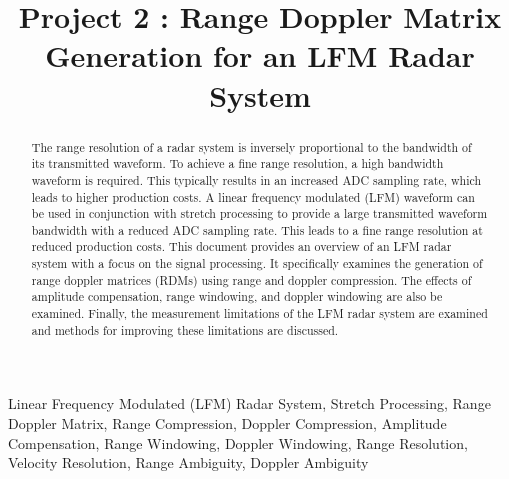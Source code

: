 \documentclass[conference]{IEEEtran}
\begin{document}
\title{Project 2 : Range Doppler Matrix Generation for an LFM Radar System}

\author{
}
\maketitle

\begin{abstract}
The range resolution of a radar system is inversely proportional to the bandwidth of its transmitted waveform. To achieve a fine range resolution, a high bandwidth waveform is required. This typically results in an increased ADC sampling rate, which leads to higher production costs. A linear frequency modulated (LFM) waveform can be used in conjunction with stretch processing to provide a large transmitted waveform bandwidth with a reduced ADC sampling rate. This leads to a fine range resolution at reduced production costs. This document provides an overview of an LFM radar system with a focus on the signal processing. It specifically examines the generation of range doppler matrices (RDMs) using range and doppler compression. The effects of amplitude compensation, range windowing, and doppler windowing are also be examined. Finally, the measurement limitations of the LFM radar system are examined and methods for improving these limitations are discussed. 
\end{abstract}

\begin{IEEEkeywords}
Linear Frequency Modulated (LFM) Radar System, Stretch Processing, Range Doppler Matrix, Range Compression, Doppler Compression, Amplitude Compensation, Range Windowing, Doppler Windowing, Range Resolution, Velocity Resolution, Range Ambiguity, Doppler Ambiguity
\end{IEEEkeywords}
\end{document}
